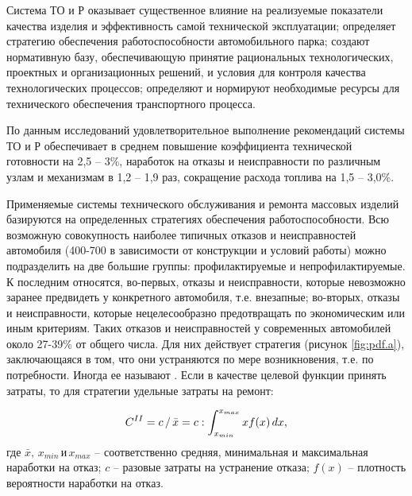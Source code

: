 \documentclass[../nirs.tex]{subfiles}
\begin{document}
Система ТО и Р оказывает существенное влияние на реализуемые показатели качества
изделия и эффективность самой технической эксплуатации; определяет стратегию
обеспечения работоспособности автомобильного парка; создают нормативную базу,
обеспечивающую принятие рациональных технологических, проектных и
организационных решений, и условия для контроля качества технологических
процессов; определяют и нормируют необходимые ресурсы для технического
обеспечения транспортного процесса.

По данным исследований удовлетворительное выполнение рекомендаций системы ТО и Р
обеспечивает в среднем повышение коэффициента технической готовности на 2,5 --
3\%, наработок на отказы и неисправности по различным узлам и механизмам в 1,2
-- 1,9 раз, сокращение расхода топлива на 1,5 -- 3,0\%.

Применяемые системы технического обслуживания и ремонта массовых изделий
базируются на определенных стратегиях обеспечения работоспособности. Всю
возможную совокупность наиболее типичных отказов и неисправностей автомобиля
(400-700 в зависимости от конструкции и условий работы) можно подразделить на
две большие группы: профилактируемые и непрофилактируемые. К последним
относятся, во-первых, отказы и неисправности, которые невозможно заранее
предвидеть у конкретного автомобиля, т.е. внезапные; во-вторых, отказы и
неисправности, которые нецелесообразно предотвращать по экономическим или иным
критериям. Таких отказов и неисправностей у современных автомобилей около
27-39\% от общего числа. Для них действует стратегия  (рисунок
\ref{fig:pdf.a}), заключающаяся в том, что они устраняются по мере
возникновения, т.е. по потребности. Иногда ее называют . Если в качестве целевой функции принять затраты, то для
стратегии  удельные затраты на ремонт:

\begin{equation*}
    C^{\rom{2}} =
    c\,/\,\bar{x} =
    c : \int_{x_{min}}^{x_{max}} x f(x)\,dx,
\end{equation*}
где $\bar{x},\,x_{min} \,\text{и} \,x_{max}$ -- соответственно средняя,
минимальная и максимальная наработки на отказ; $c$ -- разовые затраты на
устранение отказа; $f(x)$ -- плотность вероятности наработки на отказ.
\end{document}
